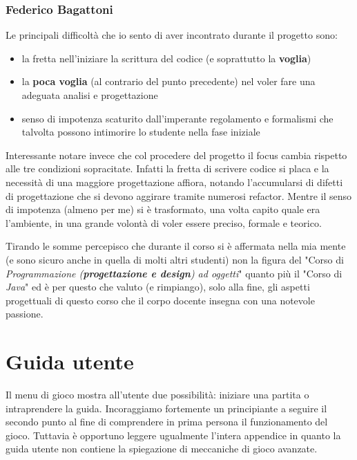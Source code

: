 \documentclass[a4paper,12pt]{report}
\begin{document}
\subsection{Federico Bagattoni}
Le principali difficoltà che io sento di aver incontrato durante il progetto sono: 
\begin{itemize}
    \item la fretta nell'iniziare la scrittura del codice (e soprattutto la \textbf{voglia})
    \item la \textbf{poca voglia} (al contrario del punto precedente) nel voler fare una adeguata analisi e progettazione
    \item senso di impotenza scaturito dall'imperante regolamento e formalismi che talvolta possono intimorire lo studente nella fase iniziale
\end{itemize}
Interessante notare invece che col procedere del progetto il focus cambia rispetto alle tre condizioni sopracitate. Infatti la fretta di scrivere codice si placa e la necessità di una maggiore progettazione affiora, notando l'accumularsi di difetti di progettazione che si devono aggirare tramite numerosi refactor. Mentre il senso di impotenza (almeno per me) si è trasformato, una volta capito quale era l'ambiente, in una grande volontà di voler essere preciso, formale e teorico. 
\par 
Tirando le somme percepisco che durante il corso si è affermata nella mia mente (e sono sicuro anche in quella di molti altri studenti) non la figura del "Corso di \textit{Programmazione (\textbf{progettazione e design}) ad oggetti}" quanto più il "Corso di \textit{Java}" ed è per questo che valuto (e rimpiango), solo alla fine, gli aspetti progettuali di questo corso che il corpo docente insegna con una notevole passione.
\appendix
\chapter{Guida utente}
Il menu di gioco mostra all'utente due possibilità: iniziare una partita o intraprendere la guida. 
\newline
Incoraggiamo fortemente un principiante a seguire il secondo punto al fine di comprendere in prima persona il funzionamento del gioco.
\newline
Tuttavia è opportuno leggere ugualmente l'intera appendice in quanto la guida utente non contiene la spiegazione di meccaniche di gioco avanzate.
\end{document}

